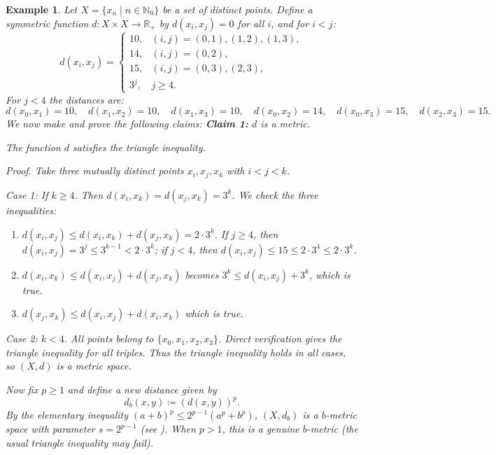 \documentclass[a4paper,12pt,oneside]{article}
\newtheorem{example}[theorem]{Example}
\numberwithin{equation}{section}
\begin{document}
\begin{example}
\label{ex:shift_map}
Let $X = \{x_{n} \mid n \in \mathbb{N}_{0}\}$ be a set of distinct points. Define a symmetric function $d: X \times X \to \mathbb{R}_{+}$ by $d(x_{i}, x_{j}) = 0$ for all $i$, and for $i < j$:
\[
d(x_i, x_j) =
\begin{cases}
10, & (i,j) = (0,1), (1,2), (1,3),\\
14, & (i,j) = (0,2),\\
15, & (i,j) = (0,3), (2,3),\\
3^j, & j \geq 4.
\end{cases}
\]
For $j<4$ the distances are:
\[
d(x_{0},x_{1}) = 10,\quad d(x_{1},x_{2}) = 10,\quad d(x_{1},x_{3}) = 10,\quad d(x_{0},x_{2}) = 14,\quad d(x_{0},x_{3}) = 15,\quad d(x_{2},x_{3}) = 15.
\]
We now make and prove the following claims:\newline
\noindent\textbf{Claim 1:} $d$ is a metric.

\noindent The function $d$ satisfies the triangle inequality.

\textit{Proof.} Take three mutually distinct points $x_{i},x_{j},x_{k}$ with $i< j< k$.

Case 1: If $k\geq 4$. Then $d(x_{i},x_{k}) = d(x_{j},x_{k}) = 3^{k}$. We check the three inequalities:
\begin{enumerate}
\item $d(x_{i},x_{j})\leq d(x_{i},x_{k}) + d(x_{j},x_{k}) = 2\cdot 3^{k}$. If $j\geq 4$, then $d(x_{i},x_{j}) = 3^{j}\leq 3^{k-1}<2\cdot 3^{k}$; if $j<4$, then $d(x_{i},x_{j})\leq 15\leq 2\cdot 3^{4}\leq 2\cdot 3^{k}$.
\item $d(x_{i},x_{k})\leq d(x_{i},x_{j}) + d(x_{j},x_{k})$ becomes $3^{k}\leq d(x_{i},x_{j}) + 3^{k}$, which is true.
\item $d(x_{j},x_{k})\leq d(x_{i},x_{j}) + d(x_{i},x_{k})$ which is true.
\end{enumerate}

Case 2: $k<4$. All points belong to $\{x_{0},x_{1},x_{2},x_{3}\}$. Direct verification gives the triangle inequality for all triples. Thus the triangle inequality holds in all cases, so $(X,d)$ is a metric space.

Now fix $p\geq 1$ and define a new distance given by
\[
d_{b}(x,y)\coloneqq \left(d(x,y)\right)^{p}.
\]
By the elementary inequality $(a + b)^{p}\leq 2^{p - 1}(a^{p} + b^{p})$, $(X,d_{b})$ is a $b$-metric space with parameter $s = 2^{p - 1}$ (see \cite{negash2025}). When $p > 1$, this is a genuine $b$-metric (the usual triangle inequality may fail).


\end{example}
\end{document}
